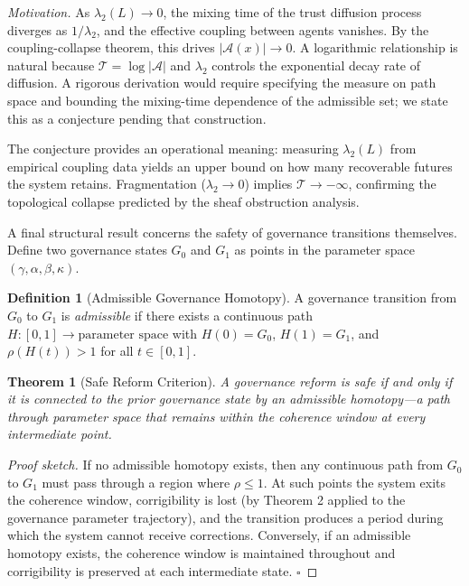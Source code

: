 \documentclass[11pt,a4paper]{article}
\theoremstyle{definition}
\newtheorem{definition}{Definition}
\theoremstyle{plain}
\newtheorem{theorem}{Theorem}
\begin{document}
\begin{mdframed}[style=appendixbox]
\noindent\textit{Motivation.} As $\lambda_2(L) \to 0$, the mixing time of the trust diffusion process diverges as $1/\lambda_2$, and the effective coupling between agents vanishes. By the coupling-collapse theorem, this drives $|\mathcal{A}(x)| \to 0$. A logarithmic relationship is natural because $\mathcal{T} = \log|\mathcal{A}|$ and $\lambda_2$ controls the exponential decay rate of diffusion. A rigorous derivation would require specifying the measure on path space and bounding the mixing-time dependence of the admissible set; we state this as a conjecture pending that construction.

The conjecture provides an operational meaning: measuring $\lambda_2(L)$ from empirical coupling data yields an upper bound on how many recoverable futures the system retains. Fragmentation ($\lambda_2 \to 0$) implies $\mathcal{T} \to -\infty$, confirming the topological collapse predicted by the sheaf obstruction analysis.

A final structural result concerns the safety of governance transitions themselves. Define two governance states $G_0$ and $G_1$ as points in the parameter space $(\gamma, \alpha, \beta, \kappa)$.

\begin{definition}[Admissible Governance Homotopy]
A governance transition from $G_0$ to $G_1$ is \emph{admissible} if there exists a continuous path $H : [0,1] \to \text{parameter space}$ with $H(0) = G_0$, $H(1) = G_1$, and $\rho(H(t)) > 1$ for all $t \in [0,1]$.
\end{definition}

\begin{theorem}[Safe Reform Criterion]
A governance reform is safe if and only if it is connected to the prior governance state by an admissible homotopy---a path through parameter space that remains within the coherence window at every intermediate point.
\end{theorem}

\begin{proof}[Proof sketch]
If no admissible homotopy exists, then any continuous path from $G_0$ to $G_1$ must pass through a region where $\rho \leq 1$. At such points the system exits the coherence window, corrigibility is lost (by Theorem 2 applied to the governance parameter trajectory), and the transition produces a period during which the system cannot receive corrections. Conversely, if an admissible homotopy exists, the coherence window is maintained throughout and corrigibility is preserved at each intermediate state. $\square$
\end{proof}


\end{mdframed}
\end{document}
